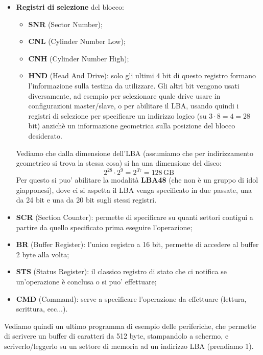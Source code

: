 \documentclass[a4paper,11pt]{article}
\begin{document}
\begin{itemize}
	\item \textbf{Registri di selezione} del blocco:
		\begin{itemize}
			\item \textbf{SNR} (Sector Number);
			\item \textbf{CNL} (Cylinder Number Low);
			\item \textbf{CNH} (Cylinder Number High);
			\item \textbf{HND} (Head And Drive): solo gli ultimi 4 bit di questo registro formano l'informazione sulla testina da utilizzare.
				Gli altri bit vengono usati diversamente, ad esempio per selezionare quale drive usare in configurazioni master/slave, o per abilitare il LBA, usando quindi i registri di selezione per specificare un indirizzo logico (su $3 \cdot 8 = 4 = 28$ bit) anzichè un informazione geometrica sulla posizione del blocco desiderato.
		\end{itemize}

		Vediamo che dalla dimensione dell'LBA (assumiamo che per indirizzamento geometrico si trova la stessa cosa) si ha una dimensione del disco:
		$$
		2^{28} \cdot 2^9 = 2^{37} = 128 \, \mathrm{GB}
		$$
		Per questo si puo' abilitare la modalità \textbf{LBA48} (che non è un gruppo di idol giapponesi), dove ci si aspetta il LBA venga specificato in due passate, una da 24 bit e una da 20 bit sugli stessi registri.
	\item \textbf{SCR} (Section Counter): permette di specificare su quanti settori contigui a partire da quello specificato prima eseguire l'operazione;
	\item \textbf{BR} (Buffer Register): l'unico registro a 16 bit, permette di accedere al buffer 2 byte alla volta;
	\item \textbf{STS} (Status Register): il classico registro di stato che ci notifica se un'operazione è conclusa o si puo' effettuare;
	\item \textbf{CMD} (Command): serve a specificare l'operazione da effettuare (lettura, scrittura, ecc...).
\end{itemize}

\par\smallskip

Vediamo quindi un ultimo programma di esempio delle periferiche, che permette di scrivere un buffer di caratteri da 512 byte, stampandolo a schermo, e scriverlo/leggerlo su un settore di memoria ad un indirizzo LBA (prendiamo 1).

\lstset{style=codestyle, language=C++}

\end{document}
